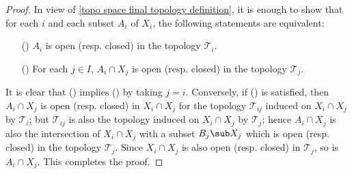 \begin{proof}
In view of \cref{topo space final topology definition}, it is enough to show that for each $i$ and each subset $A_i$ of $X_i$, the following statements are equivalent:
\begin{enumerate}
\item[(\rmnum{1})] $A_i$ is open (resp. closed) in the topology $\mathcal{T}_i$.
\item[(\rmnum{2})] For each $j\in I$, $A_i\cap X_j$ is open (resp. closed) in the topology $\mathcal{T}_j$.
\end{enumerate}
It is clear that () implies () by taking $j=i$. Conversely, if () is satisfied, then $A_i\cap X_j$ is open (resp. closed) in $X_i\cap X_j$ for the topology $\mathcal{T}_{ij}$ induced on $X_i\cap X_j$ by $\mathcal{T}_i$; but $\mathcal{T}_{ij}$ is also the topology induced on $X_i\cap X_j$ by $\mathcal{T}_{j}$; hence $A_i\cap X_j$ is also the intersection of $X_i\cap X_j$ with a subset $B_j\sub X_j$ which is open (resp. closed) in the topology $\mathcal{T}_j$. Since $X_i\cap X_j$ is also open (resp. closed) in $\mathcal{T}_j$, so is $A_i\cap X_j$. This completes the proof.
\end{proof}
